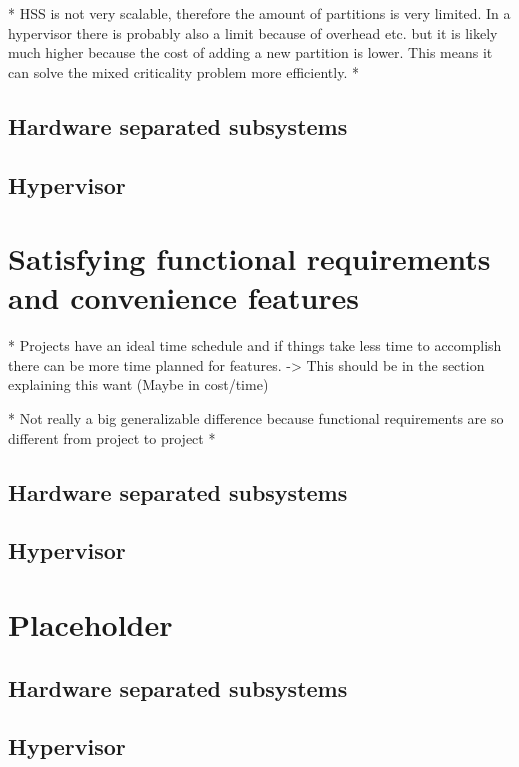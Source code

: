 * HSS is not very scalable, therefore the amount of partitions is very limited. In a hypervisor there is probably also a limit because of overhead etc. but it is likely much higher because the cost of adding a new partition is lower. This means it can solve the mixed criticality problem more efficiently.
* 
\subsection{Hardware separated subsystems}
\subsection{Hypervisor}


\section{Satisfying functional requirements and convenience features}

* Projects have an ideal time schedule and if things take less time to accomplish there can be more time planned for features.
    -> This should be in the section explaining this want (Maybe in cost/time)
    
* Not really a big generalizable difference because functional requirements are so different from project to project
*  
\subsection{Hardware separated subsystems}
\subsection{Hypervisor}


\section{Placeholder}
\subsection{Hardware separated subsystems}
\subsection{Hypervisor}

